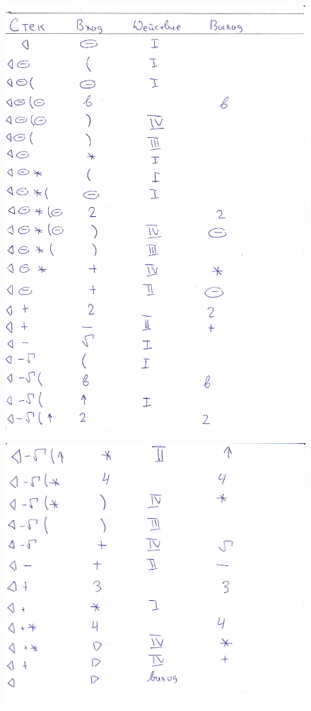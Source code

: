 \documentclass[a4paper, 14pt]{extarticle}
\begin{document}
\begin{figure}[H]
    \centering
    \includegraphics[width=\textwidth,height=\textheight,keepaspectratio]{graphics/3}
\end{figure}

\newpage

\begin{figure}[H]
    \centering
    \includegraphics[width=\textwidth,height=\textheight,keepaspectratio]{graphics/4-cropped}
\end{figure}
\end{document}
